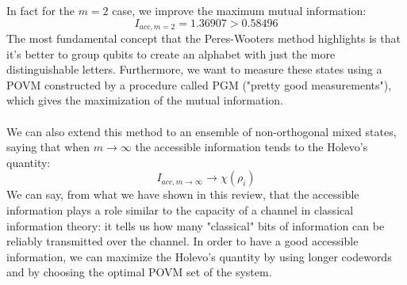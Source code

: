 \documentclass[journal, letterpaper]{IEEEtran}
\begin{document}
In fact for the $m=2$ case, we improve the maximum mutual information: 
\[I_{acc, m=2} = 1.36907 >  0.58496 \]
The most fundamental concept that the Peres-Wooters method highlights is that it's better to group qubits to create an alphabet with just the more distinguishable letters. Furthermore, we want to measure these states using a POVM constructed by a procedure called  PGM ("pretty good measurements")\cite{caltech}, which gives the maximization of the mutual information.
\\
\\We can also extend this method to an ensemble of non-orthogonal mixed states, saying that when $m\rightarrow \infty$ the accessible information tends to the Holevo's quantity: 
\[I_{acc,m\rightarrow\infty } \rightarrow \chi(\rho_i) \]
We can say, from what we have shown in this review, that the accessible information plays a role similar to the capacity of a channel in classical information theory: it tells us how many "classical" bits of information can be reliably transmitted over the channel. In order to have a good accessible information, we can maximize the Holevo's quantity by using longer codewords and by choosing the optimal POVM set of the system.
\end{document}
